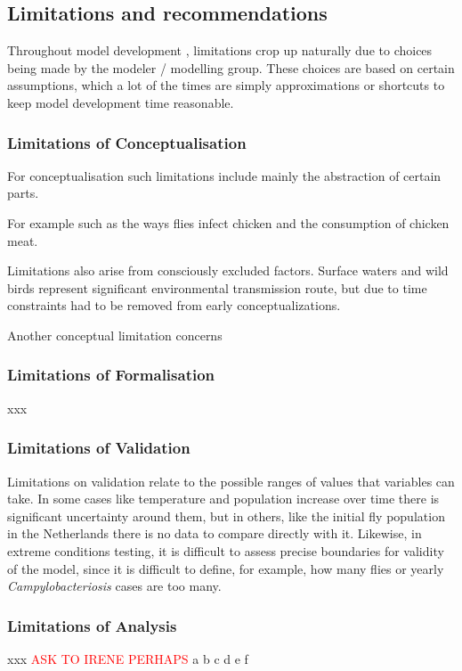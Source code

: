 \subsection{Limitations and recommendations}

Throughout model development , limitations crop up naturally due to choices being made by the modeler / modelling group. These choices are based on certain assumptions, which a lot of the times are simply approximations or shortcuts to keep model development time reasonable.

\subsubsection{Limitations of Conceptualisation}

For conceptualisation such limitations include mainly the abstraction of certain parts. 

For example such as the ways flies infect chicken and the consumption of chicken meat. 

Limitations also arise from consciously excluded factors. Surface waters and wild birds represent significant environmental transmission route, but due to time constraints had to be removed from early conceptualizations. 

Another conceptual limitation concerns

\subsubsection{Limitations of Formalisation}
xxx

\subsubsection{Limitations of Validation}

Limitations on validation relate to the possible ranges of values that variables can take. In some cases like temperature and population increase over time there is significant uncertainty around them, but in others, like the initial fly population in the Netherlands there is no data to compare directly with it. Likewise, in extreme conditions testing, it is difficult to assess precise boundaries for validity of the model, since it is difficult to define, for example, how many flies or yearly \textit{Campylobacteriosis} cases are too many.

\subsubsection{Limitations of Analysis}
xxx
\textcolor{red}{ASK TO IRENE PERHAPS}
a b c d e f

